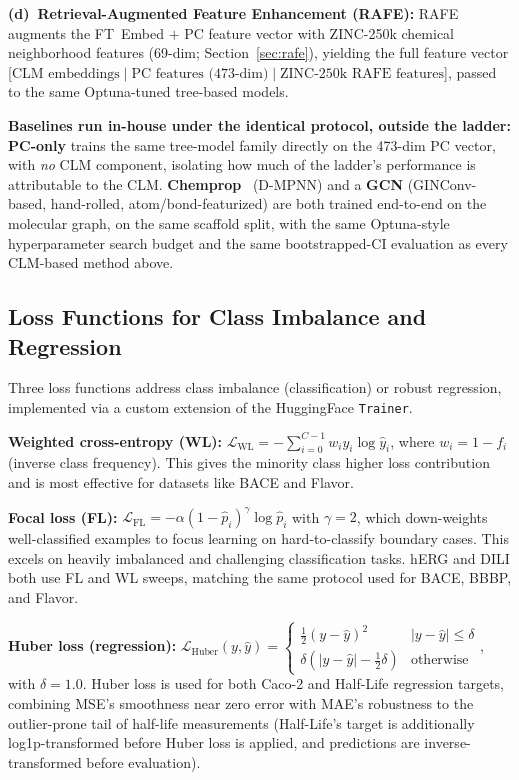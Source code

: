 \documentclass[pdflatex,sn-mathphys-num]{sn-jnl}%
\begin{document}
\textbf{(d)~Retrieval-Augmented Feature Enhancement (RAFE):} RAFE augments the FT~Embed $+$ PC feature vector with ZINC-250k chemical neighborhood features (69-dim; Section~\ref{sec:rafe}), yielding the full feature vector [$\text{CLM embeddings} \mid \text{PC features (473-dim)} \mid \text{ZINC-250k RAFE features}$], passed to the same Optuna-tuned tree-based models.

\textbf{Baselines run in-house under the identical protocol, outside the ladder:} \textbf{PC-only} trains the same tree-model family directly on the 473-dim PC vector, with \emph{no} CLM component, isolating how much of the ladder's performance is attributable to the CLM. \textbf{Chemprop}~\cite{yang2019chemprop} (D-MPNN) and a \textbf{GCN} (GINConv-based, hand-rolled, atom/bond-featurized) are both trained end-to-end on the molecular graph, on the same scaffold split, with the same Optuna-style hyperparameter search budget and the same bootstrapped-CI evaluation as every CLM-based method above.

\subsection{Loss Functions for Class Imbalance and Regression}\label{sec:loss_functions}
Three loss functions address class imbalance (classification) or robust regression, implemented via a custom extension of the HuggingFace \texttt{Trainer}.

\noindent \textbf{Weighted cross-entropy (WL):} $\mathcal{L}_{\text{WL}} = -\sum_{i=0}^{C-1} w_i y_i \log\hat{y}_i$, where $w_i = 1 - f_i$ (inverse class frequency). This gives the minority class higher loss contribution and is most effective for datasets like BACE and Flavor.

\noindent\textbf{Focal loss (FL):} $\mathcal{L}_{\text{FL}} = -\alpha (1 - \hat{p}_i)^\gamma \log\hat{p}_i$ with $\gamma = 2$, which down-weights well-classified examples to focus learning on hard-to-classify boundary cases. This excels on heavily imbalanced and challenging classification tasks. hERG and DILI both use FL and WL sweeps, matching the same protocol used for BACE, BBBP, and Flavor.

\noindent\textbf{Huber loss (regression):} $\mathcal{L}_{\text{Huber}}(y, \hat y) = \begin{cases}\tfrac{1}{2}(y-\hat y)^2 & |y - \hat y| \le \delta \\ \delta(|y-\hat y| - \tfrac12 \delta) & \text{otherwise}\end{cases}$, with $\delta = 1.0$. Huber loss is used for both Caco-2 and Half-Life regression targets, combining MSE's smoothness near zero error with MAE's robustness to the outlier-prone tail of half-life measurements (Half-Life's target is additionally log1p-transformed before Huber loss is applied, and predictions are inverse-transformed before evaluation).
\end{document}
